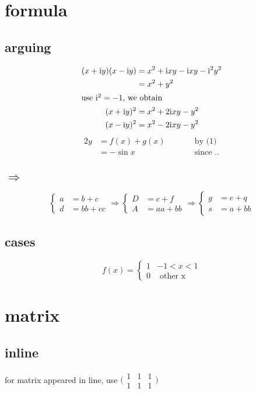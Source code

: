 \documentclass[11pt]{article}
\begin{document}
\section{formula}
\subsection{arguing}
\begin{align*}
(x+\mathrm{i}y)(x-\mathrm{i}y) &= x^2 +\mathrm{i} xy-\mathrm{i}xy-\mathrm{i}^2y^2\\
&=x^2+y^2\\
\intertext{use~$\mathrm{i}^2=-1$, we obtain}
(x+\mathrm{i}y)^2&=x^2+2\mathrm{i}xy-y^2\\
(x-\mathrm{i}y)^2&=x^2-2\mathrm{i}xy-y^2
\end{align*}
\begin{alignat*}{2}%
y &= f(x)+g(x) &\qquad &\text{by (1)}\\
&=-\sin x & &\text{since ..}
\end{alignat*}
\subsection{$\Longrightarrow$}
\begin{equation*}
\left\{\begin{aligned}
a&=b+c \\d&=bb+cc
\end{aligned}\right.
\Longrightarrow
\left\{\begin{aligned}
D&=c+f\\
A&=aa+bb
\end{aligned}\right.
\Longrightarrow
\left\{\begin{aligned}
g&=e+q\\
s&=a+bb
\end{aligned}\right.
\end{equation*}
\subsection{cases}
\begin{equation*}
f(x)=\begin{cases}
1 & -1<x<1\\
0 & \text{ other x}
\end{cases}
\end{equation*}
\newpage
\section{matrix}
\subsection{inline}
for matrix appeared in line, use 
$\bigl(\begin{smallmatrix}
1&1&1\\1&1&1\end{smallmatrix}
\bigl)$
\end{document}
